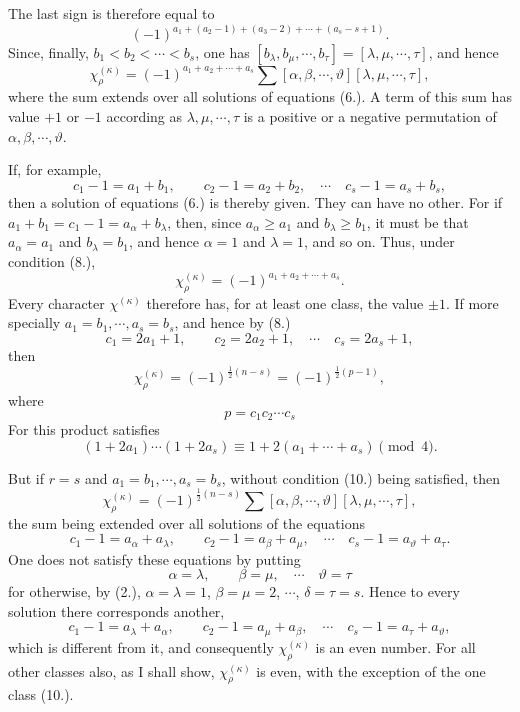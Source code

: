 \documentclass[11pt]{article}
\begin{document}
The last sign is therefore equal to
\[
 (-1)^{a_1+(a_2-1)+(a_3-2)+\cdots+(a_s-s+1)}.
\]
Since, finally, $b_1<b_2<\cdots<b_s$, one has $[b_\lambda,b_\mu,
\cdots,b_\tau]=[\lambda,\mu,
\cdots,
\tau]$, and hence
\begin{equation}\tag{7.}
 \chi_\rho^{(\kappa)}=(-1)^{a_1+a_2+
\cdots+a_s}\sum[\alpha,
\beta,
\cdots,
\vartheta][\lambda,
\mu,
\cdots,
\tau],
\end{equation}
where the sum extends over all solutions of equations (6.). A term of this sum has value $+1$ or $-1$ according as $\lambda,
\mu,
\cdots,
\tau$ is a positive or a negative permutation of $\alpha,
\beta,
\cdots,
\vartheta$.

If, for example,
\begin{equation}\tag{8.}
 c_1-1=a_1+b_1,
\qquad c_2-1=a_2+b_2,
\quad\cdots\quad c_s-1=a_s+b_s,
\end{equation}
then a solution of equations (6.) is thereby given. They can have no other. For if $a_1+b_1=c_1-1=a_\alpha+b_\lambda$, then, since $a_\alpha\geq a_1$ and $b_\lambda\geq b_1$, it must be that $a_\alpha=a_1$ and $b_\lambda=b_1$, and hence $\alpha=1$ and $\lambda=1$, and so on. Thus, under condition (8.),
\begin{equation}\tag{9.}
 \chi_\rho^{(\kappa)}=(-1)^{a_1+a_2+
\cdots+a_s}.
\end{equation}
Every character $\chi^{(\kappa)}$ therefore has, for at least one class, the value $\pm1$. If more specially $a_1=b_1,
\cdots,a_s=b_s$, and hence by (8.)
\begin{equation}\tag{10.}
 c_1=2a_1+1,
\qquad c_2=2a_2+1,
\quad\cdots\quad c_s=2a_s+1,
\end{equation}
then
\begin{equation}\tag{11.}
 \chi_\rho^{(\kappa)}=(-1)^{\frac12(n-s)}=(-1)^{\frac12(p-1)},
\end{equation}
where
\begin{equation}\tag{12.}
 p=c_1c_2\cdots c_s
\end{equation}
For this product satisfies
\[
 (1+2a_1)\cdots(1+2a_s)\equiv 1+2(a_1+
\cdots+a_s)\pmod{4}.
\]

But if $r=s$ and $a_1=b_1,
\cdots,a_s=b_s$, without condition (10.) being satisfied, then
\[
 \chi_\rho^{(\kappa)}=(-1)^{\frac12(n-s)}\sum[\alpha,
\beta,
\cdots,
\vartheta][\lambda,
\mu,
\cdots,
\tau],
\]
the sum being extended over all solutions of the equations
\[
 c_1-1=a_\alpha+a_\lambda,
\qquad c_2-1=a_\beta+a_\mu,
\quad\cdots\quad c_s-1=a_\vartheta+a_\tau.
\]
One does not satisfy these equations by putting
\[
 \alpha=\lambda,
\qquad \beta=\mu,
\quad\cdots\quad \vartheta=\tau
\]
for otherwise, by (2.), $\alpha=\lambda=1$, $\beta=\mu=2$, $\cdots$, $\delta=\tau=s$. Hence to every solution there corresponds another,
\[
 c_1-1=a_\lambda+a_\alpha,
\qquad c_2-1=a_\mu+a_\beta,
\quad\cdots\quad c_s-1=a_\tau+a_\vartheta,
\]
which is different from it, and consequently $\chi_\rho^{(\kappa)}$ is an even number. For all other classes also, as I shall show, $\chi_\rho^{(\kappa)}$ is even, with the exception of the one class (10.).
\end{document}
